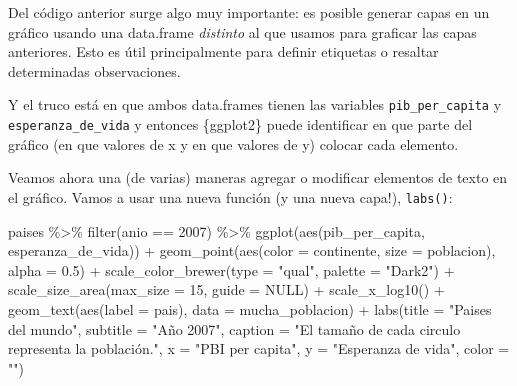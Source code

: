 \documentclass[
  openany]{book}
\newenvironment{Shaded}{\begin{snugshade}}{\end{snugshade}}
\newcommand{\AttributeTok}[1]{\textcolor[rgb]{0.77,0.63,0.00}{#1}}
\newcommand{\ConstantTok}[1]{\textcolor[rgb]{0.00,0.00,0.00}{#1}}
\newcommand{\DecValTok}[1]{\textcolor[rgb]{0.00,0.00,0.81}{#1}}
\newcommand{\FloatTok}[1]{\textcolor[rgb]{0.00,0.00,0.81}{#1}}
\newcommand{\FunctionTok}[1]{\textcolor[rgb]{0.00,0.00,0.00}{#1}}
\newcommand{\NormalTok}[1]{#1}
\newcommand{\SpecialCharTok}[1]{\textcolor[rgb]{0.00,0.00,0.00}{#1}}
\newcommand{\StringTok}[1]{\textcolor[rgb]{0.31,0.60,0.02}{#1}}
\begin{document}
Del código anterior surge algo muy importante: es posible generar capas en un gráfico usando una data.frame \emph{distinto} al que usamos para graficar las capas anteriores.
Esto es útil principalmente para definir etiquetas o resaltar determinadas observaciones.

Y el truco está en que ambos data.frames tienen las variables \texttt{pib\_per\_capita} y \texttt{esperanza\_de\_vida} y entonces \{ggplot2\} puede identificar en que parte del gráfico (en que valores de x y en que valores de y) colocar cada elemento.

Veamos ahora una (de varias) maneras agregar o modificar elementos de texto en el gráfico.
Vamos a usar una nueva función (y una nueva capa!), \texttt{labs()}:

\begin{Shaded}
\begin{Highlighting}[]
\NormalTok{paises }\SpecialCharTok{\%\textgreater{}\%} 
  \FunctionTok{filter}\NormalTok{(anio }\SpecialCharTok{==} \DecValTok{2007}\NormalTok{) }\SpecialCharTok{\%\textgreater{}\%} 
  \FunctionTok{ggplot}\NormalTok{(}\FunctionTok{aes}\NormalTok{(pib\_per\_capita, esperanza\_de\_vida)) }\SpecialCharTok{+}
  \FunctionTok{geom\_point}\NormalTok{(}\FunctionTok{aes}\NormalTok{(}\AttributeTok{color =}\NormalTok{ continente, }\AttributeTok{size =}\NormalTok{ poblacion), }\AttributeTok{alpha =} \FloatTok{0.5}\NormalTok{) }\SpecialCharTok{+}
  \FunctionTok{scale\_color\_brewer}\NormalTok{(}\AttributeTok{type =} \StringTok{"qual"}\NormalTok{, }\AttributeTok{palette =} \StringTok{"Dark2"}\NormalTok{) }\SpecialCharTok{+}
  \FunctionTok{scale\_size\_area}\NormalTok{(}\AttributeTok{max\_size =} \DecValTok{15}\NormalTok{, }\AttributeTok{guide =} \ConstantTok{NULL}\NormalTok{) }\SpecialCharTok{+}
  \FunctionTok{scale\_x\_log10}\NormalTok{() }\SpecialCharTok{+}
  \FunctionTok{geom\_text}\NormalTok{(}\FunctionTok{aes}\NormalTok{(}\AttributeTok{label =}\NormalTok{ pais), }\AttributeTok{data =}\NormalTok{ mucha\_poblacion) }\SpecialCharTok{+}
  \FunctionTok{labs}\NormalTok{(}\AttributeTok{title =} \StringTok{"Paises del mundo"}\NormalTok{,}
       \AttributeTok{subtitle =} \StringTok{"Año 2007"}\NormalTok{,}
       \AttributeTok{caption =} \StringTok{"El tamaño de cada circulo representa la población."}\NormalTok{,}
       \AttributeTok{x =} \StringTok{"PBI per capita"}\NormalTok{,}
       \AttributeTok{y =} \StringTok{"Esperanza de vida"}\NormalTok{,}
       \AttributeTok{color =} \StringTok{""}\NormalTok{)}
\end{Highlighting}
\end{Shaded}
\end{document}
